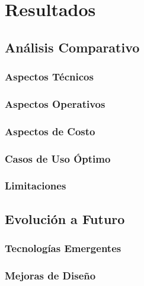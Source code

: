 \chapter{Resultados}




\section{Análisis Comparativo}

\subsection{Aspectos Técnicos}

\subsection{Aspectos Operativos}

\subsection{Aspectos de Costo}

\subsection{Casos de Uso Óptimo}

\subsection{Limitaciones}

\section{Evolución a Futuro}

\subsection{Tecnologías Emergentes}

\subsection{Mejoras de Diseño}